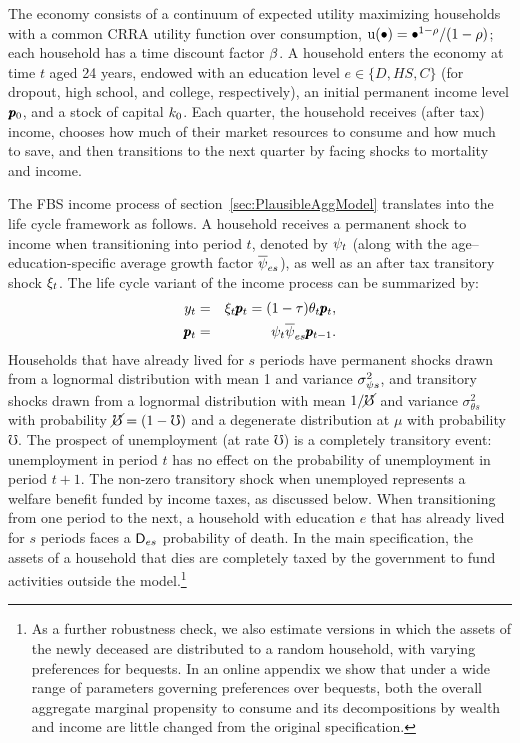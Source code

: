 \documentclass[12pt,titlepage]{econtex}
\renewcommand{\urate}{\ensuremath{\mho}}
\renewcommand{\erate}{\ensuremath{\cancel{\urate}}}
\begin{document}
The economy consists of a continuum of expected utility maximizing households with a common CRRA utility function over consumption, ${\mathrm{u}}(\bullet) = \bullet^{1-\rho}/(1-\rho)$; each household has a time discount factor $\beta$.  A household enters the economy at time $t$ aged 24 years, endowed with an education level $e \in \{D,HS,C\}$ (for dropout, high school, and college, respectively), an initial permanent income level $\pmb{p}_0$, and a stock of capital $k_0$.  Each quarter, the household receives (after tax) income, chooses how much of their market resources to consume and how much to save, and then transitions to the next quarter by facing shocks to mortality and income.

The FBS income process of section~\ref{sec:PlausibleAggModel} translates into the life cycle framework as follows. A household receives a permanent shock to income when transitioning into period $t$, denoted by $\psi_t$ (along with the age--education-specific average growth factor $\overline{\psi}_{es}$), as well as an after tax transitory shock $\xi_t$.  The life cycle variant of the income process can be summarized by:
\begin{eqnarray*}
y_t &=& \xi_t \pmb{p}_t = (1 - \tau)\theta_t \pmb{p}_t,\\
\pmb{p}_t &=& \psi_t \overline{\psi}_{es} \pmb{p}_{t-1}.
\end{eqnarray*}
Households that have already lived for $s$ periods have permanent shocks drawn from a lognormal distribution with mean 1 and variance $\sigma^2_{\psi s}$, and transitory shocks drawn from a lognormal distribution with mean $1/\erate$ and variance $\sigma^2_{\theta s}$ with probability $\erate = (1 - \urate)$ and a degenerate distribution at $\mu$ with probability $\urate$.  The prospect of unemployment (at rate $\urate$) is a completely transitory event: unemployment in period $t$ has no effect on the probability of unemployment in period $t + 1$.  The non-zero transitory shock when unemployed represents a welfare benefit funded by income taxes, as discussed below.  When transitioning from one period to the next, a household with education $e$ that has already lived for $s$ periods faces a $\mathsf{D}_{es}$ probability of death.  In the main specification, the assets of a household that dies are completely taxed by the government to fund activities outside the model.\footnote{As a further robustness check, we also estimate versions in which the assets of the newly deceased are distributed to a random household, with varying preferences for bequests. In an online appendix we show that under a wide range of parameters governing preferences over bequests, both the overall aggregate marginal propensity to consume and its decompositions by wealth and income are little changed from the original specification.
}
\end{document}
